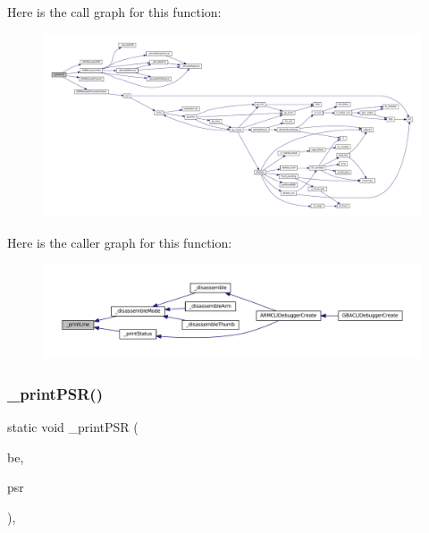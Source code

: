 Here is the call graph for this function\+:
\nopagebreak
\begin{figure}[H]
\begin{center}
\leavevmode
\includegraphics[width=350pt]{arm_2debugger_2cli-debugger_8c_a1e0fedf60889558dc8c188a2ac725c88_cgraph}
\end{center}
\end{figure}
Here is the caller graph for this function\+:
\nopagebreak
\begin{figure}[H]
\begin{center}
\leavevmode
\includegraphics[width=350pt]{arm_2debugger_2cli-debugger_8c_a1e0fedf60889558dc8c188a2ac725c88_icgraph}
\end{center}
\end{figure}
\mbox{\label{arm_2debugger_2cli-debugger_8c_abc2146e29b6db97677ad3a8321d42ffe}} 
\subsubsection{\texorpdfstring{\+\_\+print\+P\+S\+R()}{\_printPSR()}}
{\footnotesize\ttfamily static void \+\_\+print\+P\+SR (\begin{DoxyParamCaption}\item[{struct C\+L\+I\+Debugger\+Backend $\ast$}]{be,  }\item[{union P\+SR}]{psr }\end{DoxyParamCaption})\hspace{0.3cm}{\ttfamily [inline]}, {\ttfamily [static]}}

